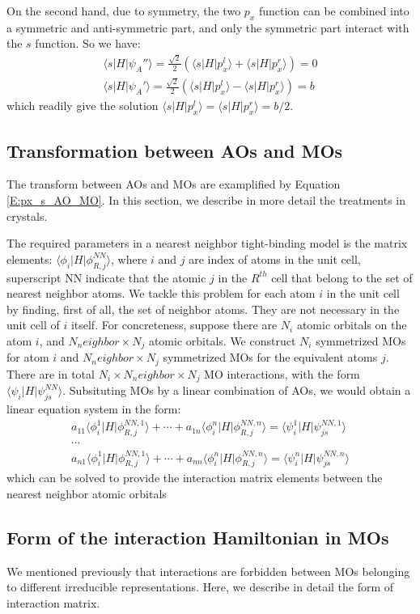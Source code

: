 \documentclass{article}
\begin{document}
On the second hand, due to symmetry, the two $p_x$ function can be combined into a symmetric and anti-symmetric part, and 
only the symmetric part interact with the $s$ function. So we have:
\begin{align}
    \label{E:px_s_AO_MO}
    \langle s | H | \psi_A'' \rangle = \frac{\sqrt{2}}{2} \left( \langle s | H | p_x^l \rangle + \langle s | H | p_x^r \rangle\right) = 0 \\
    \langle s | H | \psi_A' \rangle = \frac{\sqrt{2}}{2} \left( \langle s | H | p_x^l \rangle - \langle s | H | p_x^r \rangle\right) = b
\end{align}
which readily give the solution  $\langle s | H | p_x^l \rangle = \langle s | H | p_x^r \rangle = b/2$.

\subsection{Transformation between AOs and MOs}
The transform between AOs and MOs are examplified by Equation \eqref{E:px_s_AO_MO}. In this section, we describe in more detail the treatments
in crystals.

The required parameters in a nearest neighbor tight-binding model is the matrix elements: $\langle \phi_{i} | H | \phi^{NN}_{R,j} \rangle$,
where $i$ and $j$ are index of atoms in the unit cell, superscript NN indicate that the atomic $j$ in the $R^{th}$ cell that belong to the 
set of nearest neighbor atoms. We tackle this problem for each atom $i$ in the unit cell by finding, first of all, the set of neighbor 
atoms. They are not necessary in the unit cell of $i$ itself. For concreteness, suppose there are $N_i$ atomic orbitals on the atom $i$, and 
$N_neighbor \times N_j$ atomic orbitals. We construct $N_i$ symmetrized MOs for atom $i$ and $N_neighbor \times N_j$ symmetrized MOs for 
the equivalent atoms $j$. There are in total $N_i \times N_neighbor \times N_j$ MO interactions, with the form 
$\langle \psi_{i} | H | \psi^{NN}_{js} \rangle$. Subsituting MOs by a linear combination of AOs, we would obtain a linear equation system 
in the form:
\begin{gather}
    a_{11} \langle \phi_{i}^1 | H | \phi^{NN,1}_{R,j} \rangle + \cdots + a_{1n} \langle \phi_{i}^n | H | \phi^{NN,n}_{R,j} \rangle 
     = \langle \psi_{i}^1 | H | \psi^{NN,1}_{js} \rangle  \\
     \cdots \\
     a_{n1} \langle \phi_{i}^1 | H | \phi^{NN,1}_{R,j} \rangle + \cdots + a_{nn} \langle \phi_{i}^n | H | \phi^{NN,n}_{R,j} \rangle 
      = \langle \psi_{i}^n | H | \psi^{NN,n}_{js} \rangle 
\end{gather}
which can be solved to provide the interaction matrix elements between the nearest neighbor atomic orbitals

\subsection{Form of the interaction Hamiltonian in MOs}
We mentioned previously that interactions are forbidden between MOs belonging to different 
irreducible representations. Here, we describe in detail the form of interaction matrix. 
\end{document}
